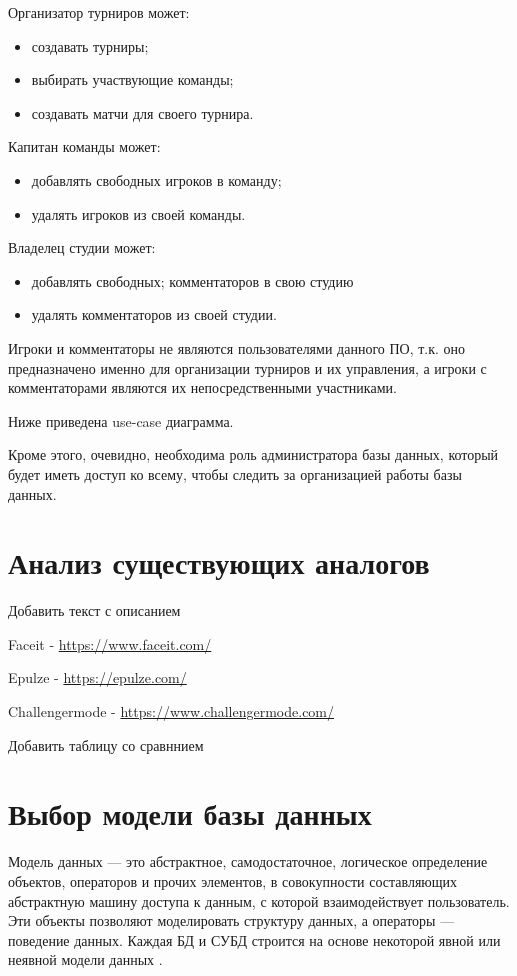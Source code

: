 Организатор турниров может:
\begin{itemize}
	\item создавать турниры;
	\item выбирать участвующие команды;
	\item создавать матчи для своего турнира.
\end{itemize}

Капитан команды может:
\begin{itemize}
	\item добавлять свободных игроков в команду;
	\item удалять игроков из своей команды.
\end{itemize}

Владелец студии может:
\begin{itemize}
	\item добавлять свободных; комментаторов в свою студию
	\item удалять комментаторов из своей студии.
\end{itemize}

Игроки и комментаторы не являются пользователями данного ПО, т.к. оно предназначено именно для организации турниров и их управления, а игроки с комментаторами являются их непосредственными участниками.

\newpage
Ниже приведена use-case диаграмма.

Кроме этого, очевидно, необходима роль администратора базы данных, который будет иметь доступ ко всему, чтобы следить за организацией работы базы данных.


\section{Анализ существующих аналогов}
Добавить текст с описанием

Faceit - \url{https://www.faceit.com/}

Epulze - \url{https://epulze.com/}

Challengermode - \url{https://www.challengermode.com/}

Добавить таблицу со сравннием

\section{Выбор модели базы данных}
Модель данных — это абстрактное, самодостаточное, логическое определение объектов, операторов и прочих элементов, в совокупности составляющих абстрактную машину доступа к данным, с которой взаимодействует пользователь. Эти объекты позволяют моделировать структуру данных, а операторы — поведение данных. Каждая БД и СУБД строится на основе некоторой явной или неявной модели данных \cite{Deit book}.

